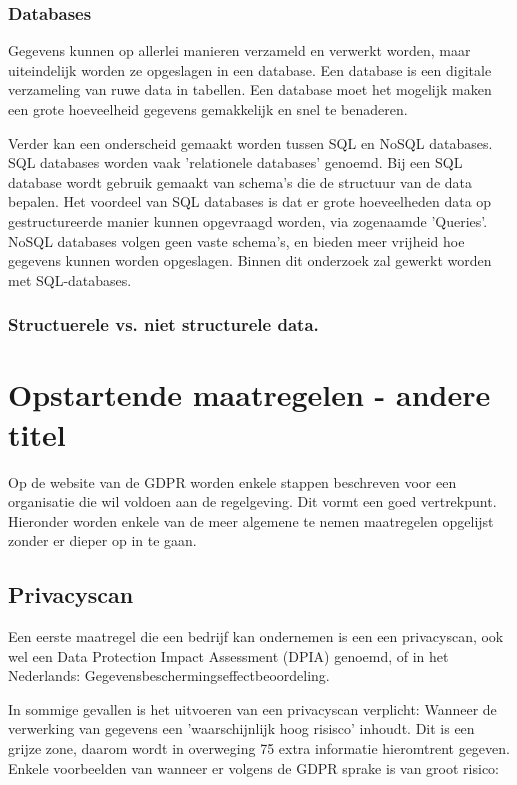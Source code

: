 \subsubsection{Databases} 
Gegevens kunnen op allerlei manieren verzameld en verwerkt worden, maar uiteindelijk worden ze opgeslagen in een database. Een database is een digitale verzameling van ruwe data in tabellen. Een database moet het mogelijk maken een grote hoeveelheid gegevens gemakkelijk en snel te benaderen. 

Verder kan een onderscheid gemaakt worden tussen SQL en NoSQL databases. SQL databases worden vaak 'relationele databases' genoemd. Bij een SQL database wordt gebruik gemaakt van schema's die de structuur van de data bepalen. Het voordeel van SQL databases is dat er grote hoeveelheden data op gestructureerde manier kunnen opgevraagd worden, via zogenaamde 'Queries'. \\
NoSQL databases volgen geen vaste schema's, en bieden meer vrijheid hoe gegevens kunnen worden opgeslagen. 
Binnen dit onderzoek zal gewerkt worden met SQL-databases. 

\subsubsection{Structuerele vs. niet structurele data.}


\section{Opstartende maatregelen - andere titel } 
Op de website van de GDPR worden enkele stappen beschreven voor een organisatie die wil voldoen aan de regelgeving. Dit vormt een goed vertrekpunt. Hieronder worden enkele van de meer algemene te nemen maatregelen opgelijst zonder er dieper op in te gaan. 

\subsection{Privacyscan}
Een eerste maatregel die een bedrijf kan ondernemen is een een privacyscan, ook wel een Data Protection Impact Assessment (DPIA) genoemd, of in het Nederlands: Gegevensbeschermingseffectbeoordeling. 

In sommige gevallen is het uitvoeren van een privacyscan verplicht: 
Wanneer de verwerking van gegevens een 'waarschijnlijk hoog risisco' inhoudt. Dit is een grijze zone, daarom wordt in overweging 75 extra informatie hieromtrent gegeven. Enkele voorbeelden van wanneer er volgens de GDPR sprake is van groot risico: 

